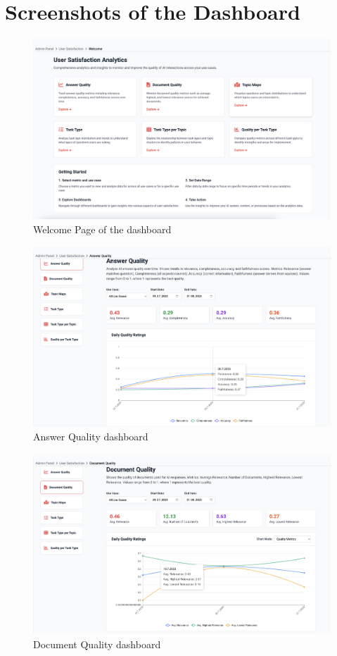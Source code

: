 \documentclass[
	english,
	ruledheaders=section,%
	class=report,%
	thesis={type=bachelor},%
	accentcolor=1b,%
	custommargins=true,%
	marginpar=false,%
	parskip=half-,%
	fontsize=11pt,%
	DIV=14,
]{tudapub}
\begin{document}
\section*{Screenshots of the Dashboard}

\begin{figure}[h!]
    \centering
    \includegraphics[width=0.75\linewidth]{images/WelcomePage.png}
    \captionsetup{list=no}
    \caption{Welcome Page of the dashboard}
    \label{fig:welcome_page}
\end{figure}

\begin{figure}[h!]
    \centering
    \includegraphics[width=0.75\linewidth]{images/AnswerQuality.png}
    \captionsetup{list=no}
    \caption{Answer Quality dashboard}
    \label{fig:answer_quality}
\end{figure}

\begin{figure}[h!]
    \centering
    \includegraphics[width=0.75\linewidth]{images/DocumentQuality.png}
    \captionsetup{list=no}
    \caption{Document Quality dashboard}
    \label{fig:document_quality}
\end{figure}
\end{document}
